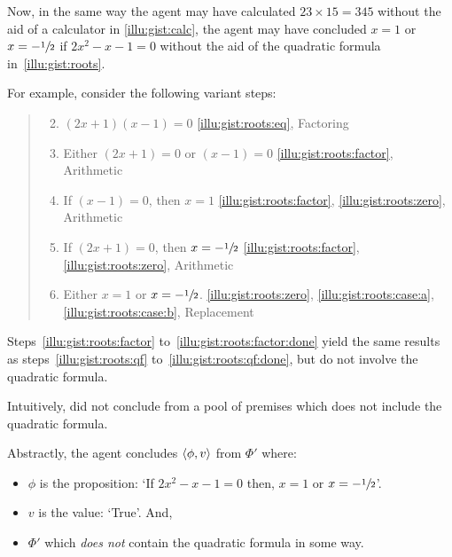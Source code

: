 \begin{note}
  Now, in the same way the agent may have calculated \(23 \times 15 = 345\) without the aid of a calculator in \autoref{illu:gist:calc}, the agent may have concluded \(x = 1\) or \(x = -\sfrac{1}{2}\) if \(2x^{2} - x - 1 = 0\) without the aid of the quadratic formula in~\autoref{illu:gist:roots}.

  For example, consider the following variant steps:
  \begin{quote}
    \begin{enumerate}[label=\arabic*\('\)., ref=(\arabic*\('\)), itemsep=.125em]
      \setcounter{enumi}{1}
    \item
      \label{illu:gist:roots:factor}
      \((2x + 1)(x - 1) = 0\) \hfill \ref{illu:gist:roots:eq}, Factoring
    \item
      \label{illu:gist:roots:zero}
      Either \((2x + 1) = 0\) or \((x - 1) = 0\) \hfill \ref{illu:gist:roots:factor}, Arithmetic
    \item
      \label{illu:gist:roots:case:a}
      If \((x - 1) = 0\), then \(x = 1\) \hfill \ref{illu:gist:roots:factor}, \ref{illu:gist:roots:zero}, Arithmetic
    \item
      \label{illu:gist:roots:case:b}
      If \((2x + 1) = 0\), then \(x = -\sfrac{1}{2}\) \hfill \ref{illu:gist:roots:factor}, \ref{illu:gist:roots:zero}, Arithmetic
    \item
      \label{illu:gist:roots:factor:done}
      Either \(x = 1\) or \(x = -\sfrac{1}{2}\). \hfill \ref{illu:gist:roots:zero}, \ref{illu:gist:roots:case:a}, \ref{illu:gist:roots:case:b}, Replacement
    \end{enumerate}
  \end{quote}

  Steps~\ref{illu:gist:roots:factor} to~\ref{illu:gist:roots:factor:done} yield the same results as steps~\ref{illu:gist:roots:qf} to~\ref{illu:gist:roots:qf:done}, but do not involve the quadratic formula.
\end{note}

\begin{note}
  Intuitively, did not conclude from a pool of premises which does not include the quadratic formula.

  Abstractly, the agent concludes \(\langle \phi, v \rangle\) from \(\Phi'\) where:
  \begin{itemize}[noitemsep]
  \item
    \(\phi\) is the proposition: `If \(2x^{2} - x - 1 = 0\) then, \(x = 1\) or \(x = -\sfrac{1}{2}\)'.
  \item
    \(v\) is the value: `True'.
    And,
  \item
    \(\Phi'\) which \emph{does not} contain the quadratic formula in some way.
  \end{itemize}
\end{note}

